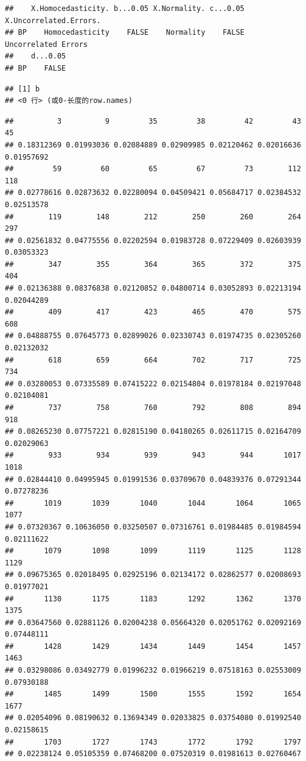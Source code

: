\documentclass[
]{article}
\begin{document}
\begin{verbatim}
##    X.Homocedasticity. b...0.05 X.Normality. c...0.05 X.Uncorrelated.Errors.
## BP    Homocedasticity    FALSE    Normality    FALSE    Uncorrelated Errors
##    d...0.05
## BP    FALSE
\end{verbatim}

\begin{verbatim}
## [1] b
## <0 行> (或0-长度的row.names)
\end{verbatim}

\begin{verbatim}
##          3          9         35         38         42         43         45 
## 0.18312369 0.01993036 0.02084889 0.02909985 0.02120462 0.02016636 0.01957692 
##         59         60         65         67         73        112        118 
## 0.02778616 0.02873632 0.02280094 0.04509421 0.05684717 0.02384532 0.02513578 
##        119        148        212        250        260        264        297 
## 0.02561832 0.04775556 0.02202594 0.01983728 0.07229409 0.02603939 0.03053323 
##        347        355        364        365        372        375        404 
## 0.02136388 0.08376838 0.02120852 0.04800714 0.03052893 0.02213194 0.02044289 
##        409        417        423        465        470        575        608 
## 0.04888755 0.07645773 0.02899026 0.02330743 0.01974735 0.02305260 0.02132032 
##        618        659        664        702        717        725        734 
## 0.03280053 0.07335589 0.07415222 0.02154804 0.01978184 0.02197048 0.02104081 
##        737        758        760        792        808        894        918 
## 0.08265230 0.07757221 0.02815190 0.04180265 0.02611715 0.02164709 0.02029063 
##        933        934        939        943        944       1017       1018 
## 0.02844410 0.04995945 0.01991536 0.03709670 0.04839376 0.07291344 0.07278236 
##       1019       1039       1040       1044       1064       1065       1077 
## 0.07320367 0.10636050 0.03250507 0.07316761 0.01984485 0.01984594 0.02111622 
##       1079       1098       1099       1119       1125       1128       1129 
## 0.09675365 0.02018495 0.02925196 0.02134172 0.02862577 0.02008693 0.01977021 
##       1130       1175       1183       1292       1362       1370       1375 
## 0.03647560 0.02881126 0.02004238 0.05664320 0.02051762 0.02092169 0.07448111 
##       1428       1429       1434       1449       1454       1457       1463 
## 0.03298086 0.03492779 0.01996232 0.01966219 0.07518163 0.02553009 0.07930188 
##       1485       1499       1500       1555       1592       1654       1677 
## 0.02054096 0.08190632 0.13694349 0.02033825 0.03754080 0.01992540 0.02158615 
##       1703       1727       1743       1772       1792       1797 
## 0.02238124 0.05105359 0.07468200 0.07520319 0.01981613 0.02760467
\end{verbatim}
\end{document}

